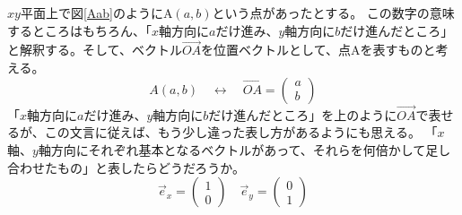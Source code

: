 \documentclass[10pt]{jsarticle}
\theoremstyle{definition}%
\newcommand{\vc}[1]{\overrightarrow{#1}}%
\numberwithin{equation}{section}%
\begin{document}
$xy$平面上で図\ref{Aab}のようにA$(a,b)$という点があったとする。
この数字の意味するところはもちろん、「$x$軸方向に$a$だけ進み、$y$軸方向に$b$だけ進んだところ」と解釈する。そして、ベクトル$\vc{OA}$を位置ベクトルとして、点Aを表すものと考える。
\begin{equation}
  A(a,b)\quad\leftrightarrow\quad \vc{OA}=\left(\begin{matrix}
    a\\
    b
  \end{matrix}\right)
\end{equation}
「$x$軸方向に$a$だけ進み、$y$軸方向に$b$だけ進んだところ」を上のように$\vc{OA}$で表せるが、この文言に従えば、もう少し違った表し方があるようにも思える。
「$x$軸、$y$軸方向にそれぞれ基本となるベクトルがあって、それらを何倍かして足し合わせたもの」と表したらどうだろうか。
\begin{equation}
  \vec{e}_{x}=\left(\begin{matrix}
    1\\
    0
  \end{matrix}\right)\quad \vec{e}_{y}=\left(\begin{matrix}
    0\\
    1
  \end{matrix}\right)
\end{equation}
\end{document}
